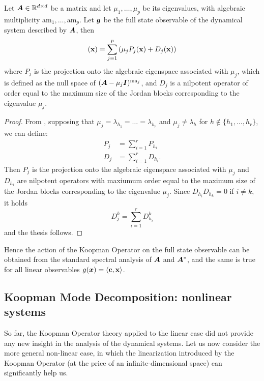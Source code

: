 \begin{corollary}
Let $\vb*{A}\in\mathbb{R}^{d\times d}$ be a matrix and let $\mu_1, \dots, \mu_p$ be its eigenvalues, with algebraic multiplicity $\mathrm{am}_1, \dots, \mathrm{am}_p$. Let $\vb*{g}$ be the full state observable of the dynamical system described by $\vb*{A}$, then
\begin{equation*}
    [\mathcal{K}\vb{g}](\vb{x}) = \sum_{j = 1}^{p} \left(\mu_j P_j(\vb{x}) + D_j(\vb{x}) \right)
\end{equation*}
where $P_j$ is the projection onto the algebraic eigenspace associated with $\mu_j$, which is defined as the null space of $(\vb*{A} - \mu_j\vb*{I})^{\mathrm{ma}_j}$, and $D_j$ is a nilpotent operator of order equal to the maximum size of the Jordan blocks corresponding to the eigenvalue $\mu_j$. 
\end{corollary}
\begin{proof}
From , supposing that $\mu_j = \lambda_{h_1} = \dots = \lambda_{h_r}$ and $\mu_j \neq \lambda_{h}$ for $h\notin\{h_1,\dots, h_r\}$, we can define:
\begin{equation*}
    \begin{split}
        P_j &= \sum_{i=1}^r P_{h_i}\\
        D_j &= \sum_{i=1}^r D_{h_i}.
    \end{split}
\end{equation*}
Then $P_j$ is the projection onto the algebraic eigenspace associated with $\mu_j$ and $D_{h_i}$ are nilpotent operators with maxiumum order equal to the maximum size of the Jordan blocks corresponding to the eigenvalue $\mu_j$. Since $D_{h_i}D_{h_k} = 0$ if $i\neq k$, it holds
\begin{equation*}
    D_j^k = \sum_{i=1}^r D_{h_i}^k
\end{equation*}
and the thesis follows.
\end{proof}

Hence the action of the Koopman Operator on the full state observable can be obtained from the standard spectral analysis of $\vb*{A}$ and $\vb*{A}^*$, and the same is true for all linear observables $g(\vb*{x}) = \langle \vb{c}, \vb{x} \rangle$.

\subsection{Koopman Mode Decomposition: nonlinear systems}
So far, the Koopman Operator theory applied to the linear case did not provide any new insight in the analysis of the dynamical systems. Let us now consider the more general non-linear case, in which the linearization introduced by the Koopman Operator (at the price of an infinite-dimensional space) can significantly help us.

